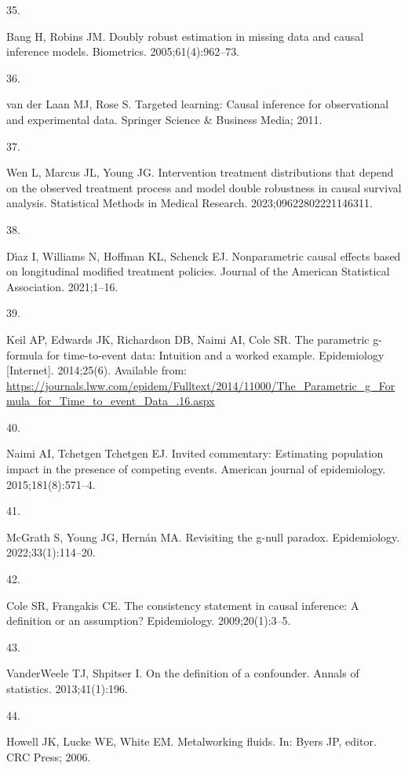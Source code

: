\documentclass[
  11pt,
  letterpaper,
  DIV=11,
  numbers=noendperiod]{scrartcl}
\newlength{\cslhangindent}
\newlength{\csllabelwidth}
\newenvironment{CSLReferences}[2] %
 {\begin{list}{}{%
  \setlength{\itemindent}{0pt}
  \setlength{\leftmargin}{0pt}
  \setlength{\parsep}{0pt}
  \ifodd #1
   \setlength{\leftmargin}{\cslhangindent}
   \setlength{\itemindent}{-1\cslhangindent}
  \fi
  \setlength{\itemsep}{#2\baselineskip}}}
 {\end{list}}
\newcommand{\CSLLeftMargin}[1]{\parbox[t]{\csllabelwidth}{\strut#1\strut}}
\newcommand{\CSLRightInline}[1]{\parbox[t]{\linewidth - \csllabelwidth}{\strut#1\strut}}
\begin{document}
\begin{CSLReferences}{1}{0}
\CSLLeftMargin{35. }%
\CSLRightInline{Bang H, Robins JM. Doubly robust estimation in missing
data and causal inference models. Biometrics. 2005;61(4):962--73. }

\CSLLeftMargin{36. }%
\CSLRightInline{van der Laan MJ, Rose S. Targeted learning: Causal
inference for observational and experimental data. Springer Science \&
Business Media; 2011. }

\CSLLeftMargin{37. }%
\CSLRightInline{Wen L, Marcus JL, Young JG. Intervention treatment
distributions that depend on the observed treatment process and model
double robustness in causal survival analysis. Statistical Methods in
Medical Research. 2023;09622802221146311. }

\CSLLeftMargin{38. }%
\CSLRightInline{Dı́az I, Williams N, Hoffman KL, Schenck EJ.
Nonparametric causal effects based on longitudinal modified treatment
policies. Journal of the American Statistical Association. 2021;1--16. }

\CSLLeftMargin{39. }%
\CSLRightInline{Keil AP, Edwards JK, Richardson DB, Naimi AI, Cole SR.
The parametric g-formula for time-to-event data: Intuition and a worked
example. Epidemiology {[}Internet{]}. 2014;25(6). Available from:
\url{https://journals.lww.com/epidem/Fulltext/2014/11000/The_Parametric_g_Formula_for_Time_to_event_Data_.16.aspx}}

\CSLLeftMargin{40. }%
\CSLRightInline{Naimi AI, Tchetgen Tchetgen EJ. Invited commentary:
Estimating population impact in the presence of competing events.
American journal of epidemiology. 2015;181(8):571--4. }

\CSLLeftMargin{41. }%
\CSLRightInline{McGrath S, Young JG, Hernán MA. Revisiting the g-null
paradox. Epidemiology. 2022;33(1):114--20. }

\CSLLeftMargin{42. }%
\CSLRightInline{Cole SR, Frangakis CE. The consistency statement in
causal inference: A definition or an assumption? Epidemiology.
2009;20(1):3--5. }

\CSLLeftMargin{43. }%
\CSLRightInline{VanderWeele TJ, Shpitser I. On the definition of a
confounder. Annals of statistics. 2013;41(1):196. }

\CSLLeftMargin{44. }%
\CSLRightInline{Howell JK, Lucke WE, White EM. Metalworking fluids. In:
Byers JP, editor. CRC Press; 2006. }


\end{CSLReferences}
\end{document}
